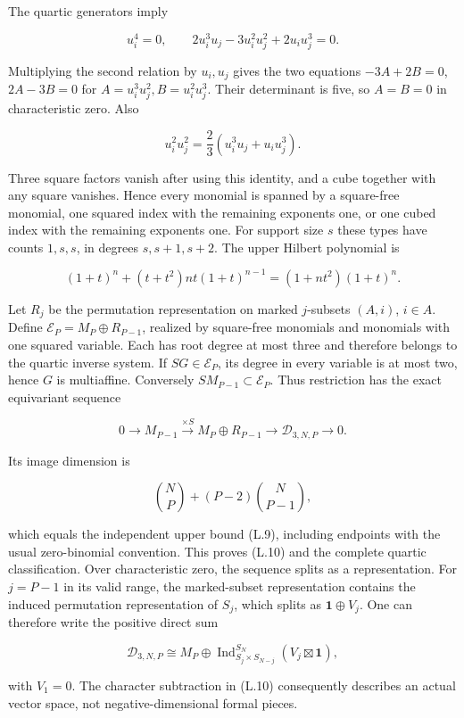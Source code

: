 \documentclass[a4paper,11pt]{article}
\numberwithin{equation}{section}
\begin{document}
The quartic generators imply

\[
u_i^4=0,\qquad2u_i^3u_j-3u_i^2u_j^2+2u_iu_j^3=0.
\tag{L.7}
\]

Multiplying the second relation by \(u_i,u_j\) gives the two equations \(-3A+2B=0\), \(2A-3B=0\) for \(A=u_i^3u_j^2,B=u_i^2u_j^3\). Their determinant is five, so \(A=B=0\) in characteristic zero. Also

\[
u_i^2u_j^2=\frac23(u_i^3u_j+u_iu_j^3).
\tag{L.8}
\]

Three square factors vanish after using this identity, and a cube together with any square vanishes. Hence every monomial is spanned by a square-free monomial, one squared index with the remaining exponents one, or one cubed index with the remaining exponents one. For support size \(s\) these types have counts \(1,s,s\), in degrees \(s,s+1,s+2\). The upper Hilbert polynomial is

\[
(1+t)^n+(t+t^2)nt(1+t)^{n-1}=(1+nt^2)(1+t)^n.
\tag{L.9}
\]

Let \(R_j\) be the permutation representation on marked \(j\)-subsets \((A,i)\), \(i\in A\). Define \(\mathcal E_P=M_P\oplus R_{P-1}\), realized by square-free monomials and monomials with one squared variable. Each has root degree at most three and therefore belongs to the quartic inverse system. If \(SG\in\mathcal E_P\), its degree in every variable is at most two, hence \(G\) is multiaffine. Conversely \(SM_{P-1}\subset\mathcal E_P\). Thus restriction has the exact equivariant sequence

\[
0\longrightarrow M_{P-1}\xrightarrow{\times S}
M_P\oplus R_{P-1}\longrightarrow\mathscr D_{3,N,P}\longrightarrow0.
\tag{L.10}
\]

Its image dimension is

\[
\binom NP+(P-2)\binom N{P-1},
\tag{L.11}
\]

which equals the independent upper bound (L.9), including endpoints with the usual zero-binomial convention. This proves (L.10) and the complete quartic classification. Over characteristic zero, the sequence splits as a representation. For \(j=P-1\) in its valid range, the marked-subset representation contains the induced permutation representation of \(S_j\), which splits as \(\mathbf1\oplus V_j\). One can therefore write the positive direct sum

\[
\mathscr D_{3,N,P}\cong M_P\oplus
\operatorname{Ind}_{S_j\times S_{N-j}}^{S_N}(V_j\boxtimes\mathbf1),
\tag{L.12}
\]

with \(V_1=0\). The character subtraction in (L.10) consequently describes an actual vector space, not negative-dimensional formal pieces.
\end{document}
